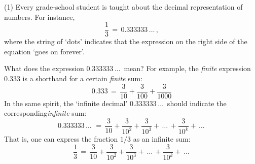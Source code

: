 \V

        (1) Every grade-school student is taught about the decimal representation of numbers. For instance,
        \begin{displaymath}
        \frac{1}{3} \,=\, 0.333333\,{\ldots}\,,
        \end{displaymath}
    where the string of `dots' indicates that the expression on the right side of the equation `goes on forever'.

        What does the expression $0.333333\,{\ldots}\,$ mean? For example, the {\em finite} expression $0.333$ is a shorthand for a certain {\em finite}  sum:
        \begin{displaymath}
        0.333 \,=\, \frac{3}{10} + \frac{3}{100} + \frac{3}{1000}
        \end{displaymath}
    In the same spirit, the `infinite decimal' $0.333333\,{\ldots}\,$ should indicate the corresponding{\em infinite} sum:
        \begin{displaymath}
        0.333333\,{\ldots}\, \,=\, \frac{3}{10} + \frac{3}{10^{2}} + \frac{3}{10^{3}} + \,{\ldots}\,+ \frac{3}{10^{k}} + \,{\ldots}\,
        \end{displaymath}
    That is, one can express the fraction $1/3$ as an infinite sum:
        \begin{displaymath}
        \frac{1}{3} \,=\, \frac{3}{10} + \frac{3}{10^{2}} + \frac{3}{10^{3}} + \,{\ldots}\,+ \frac{3}{10^{k}} + \,{\ldots}\,
        \end{displaymath}

\V

